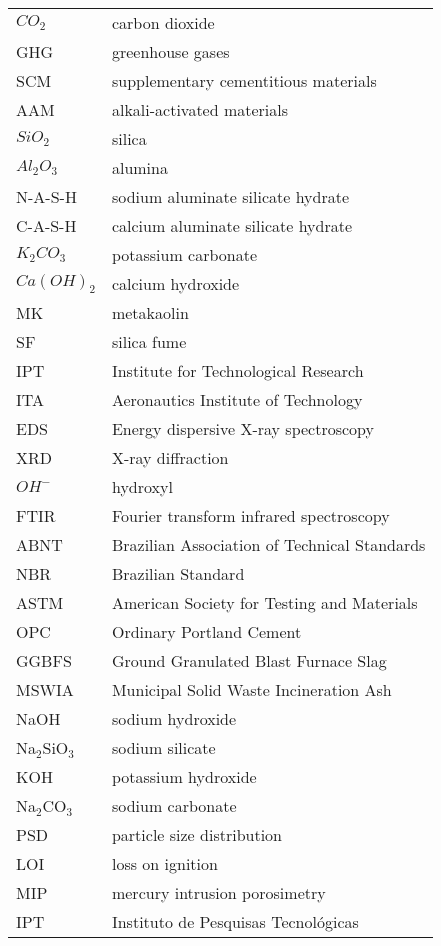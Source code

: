 \begin{longtable}{ll}
$CO_2$ & carbon dioxide \\
GHG & greenhouse gases \\
SCM & supplementary cementitious materials \\
AAM & alkali-activated materials \\
$ SiO_2$ & silica \\
$ Al_2O_3$ & alumina \\
N-A-S-H & sodium aluminate silicate hydrate \\
C-A-S-H & calcium aluminate silicate hydrate  \\
$K_2CO_3$ & potassium carbonate \\
$Ca(OH)_2$ & calcium hydroxide \\
MK & metakaolin \\
SF & silica fume \\
IPT & Institute for Technological Research \\
ITA & Aeronautics Institute of Technology \\
EDS & Energy dispersive X-ray spectroscopy \\
XRD & X-ray diffraction \\
$OH^-$ & hydroxyl \\
FTIR & Fourier transform infrared spectroscopy \\
ABNT & Brazilian Association of Technical Standards \\
NBR & Brazilian Standard \\
ASTM & American Society for Testing and Materials \\
OPC & Ordinary Portland Cement \\
GGBFS & Ground Granulated Blast Furnace Slag \\
MSWIA & Municipal Solid Waste Incineration Ash \\
NaOH & sodium hydroxide \\
Na$_2$SiO$_3$ & sodium silicate \\
KOH & potassium hydroxide \\
Na$_2$CO$_3$ & sodium carbonate \\
PSD & particle size distribution \\
LOI & loss on ignition \\
MIP & mercury intrusion porosimetry \\
IPT & Instituto de Pesquisas Tecnológicas \\
\end{longtable}